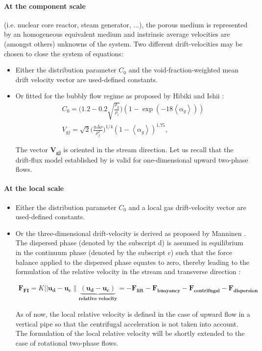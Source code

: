 \paragraph{At the component scale } (i.e. nuclear core reactor, steam generator, ...), the porous medium is represented by an homogeneous equivalent medium and instrinsic average velocities are (amongst others) unknowns of the system. Two different drift-velocities may be chosen to close the system of equations:
\begin{itemize}
	\item Either the distribution parameter $C_0$ and the void-fraction-weighted mean drift velocity vector are used-defined constants. 
	\item Or fitted for the bubbly flow regime as proposed by  Hibiki and Ishii \cite{hibiki2002distribution} : 
	\begin{align}
		C_0 = \big(1.2 - 0.2 \sqrt{\frac{\rho_g}{\rho_l}}\big)(1-\exp(-18\left\langle\alpha_g\right\rangle))\\
		V_{gj} = \sqrt{2}\big(\frac{g\Delta\rho}{\rho_f^2}\big)^{1/4}(1-\left\langle\alpha_g\right\rangle)^{1.75},
	\end{align}

The vector $\mathbf{V_{gj}}$ is oriented in the stream direction. Let us recall that the drift-flux model established by \cite{hibiki2002distribution} is valid for one-dimensional upward two-phase flows. 
\end{itemize}

\paragraph{At the local scale} 
\begin{itemize}
	\item Either the distribution parameter $C_0$ and a local gas drift-velocity vector are used-defined constants. 
	\item Or the three-dimensional drift-velocity is derived as proposed by Manninen \cite{manninen1996mixture}. The dispersed phase (denoted by the subscript d) is assumed in equilibrium in the continuum phase (denoted by the subscript c) such that the force balance applied to the dispersed phase equates to zero, thereby leading to the formulation of the relative velocity in the stream and transverse direction :
	
	\begin{align}
		\mathbf{F_{FI}} = K ||\mathbf{u_d} - \mathbf{u_c}\rVert \underbrace{(\mathbf{u_d} - \mathbf{u_c})}_\textbf{relative velocity}  = - \mathbf{F_{lift}} - \mathbf{F_{buoyancy}} -\mathbf{F_{centrifugal}} -\mathbf{F_{dispersion}} 
	\end{align}	 

As of now, the local relative velocity is defined in the case of upward flow in a vertical pipe so that the centrifugal acceleration is not taken into account. The formulation of the local relative velocity will be shortly extended to the case of rotational two-phase flows.  

\end{itemize}


 


